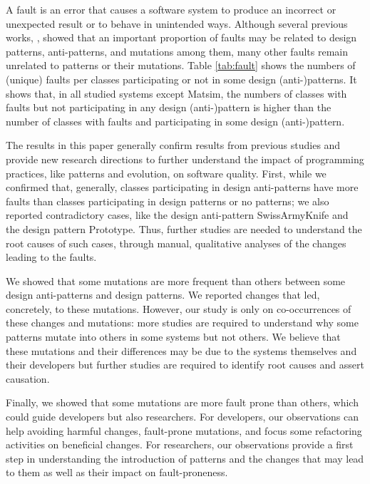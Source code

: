 A fault is an error that causes a software system to produce an incorrect or unexpected result or to behave in unintended ways. Although several previous works, \eg{} \cite{khomh2012exploratory,jaafar2014anti}, showed that an important proportion of faults may be related to design patterns, anti-patterns, and mutations among them, many other faults remain unrelated to patterns or their mutations. Table \ref{tab:fault} shows the numbers of (unique) faults per classes participating or not in some design (anti-)patterns. It shows that, in all studied systems except Matsim, the numbers of classes with faults but not participating in any design (anti-)pattern is higher than the number of classes with faults and participating in some design (anti-)pattern.

The results in this paper generally confirm results from previous studies and provide new research directions to further understand the impact of programming practices, like patterns and evolution, on software quality. First, while we confirmed that, generally, classes participating in design anti-patterns have more faults than classes participating in design patterns or no patterns; we also reported contradictory cases, like the design anti-pattern SwissArmyKnife and the design pattern Prototype. Thus, further studies are needed to understand the root causes of such cases, through manual, qualitative analyses of the changes leading to the faults.

We showed that some mutations are more frequent than others between some design anti-patterns and design patterns. We reported changes that led, concretely, to these mutations. However, our study is only on co-occurrences of these changes and mutations: more studies are required to understand why some patterns mutate into others in some systems but not others. We believe that these mutations and their differences may be due to the systems themselves and their developers but further studies are required to identify root causes and assert causation.

Finally, we showed that some mutations are more fault prone than others, which could guide developers but also researchers. For developers, our observations can help avoiding harmful changes, \ie{} fault-prone mutations, and focus some refactoring activities on beneficial changes. For researchers, our observations provide a first step in understanding the introduction of patterns and the changes that may lead to them as well as their impact on fault-proneness.